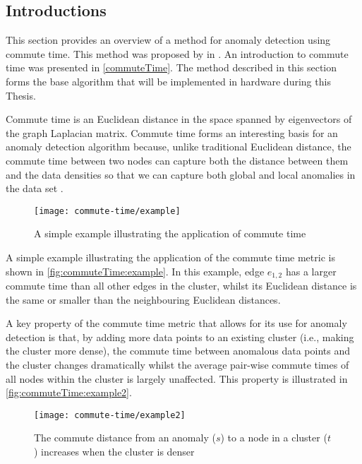 \subsection{Introductions}
\label{anomalyDetection:commuteTime:introduction}
This section provides an overview of a method for anomaly detection using
commute time. This method was proposed by \citeauthor{Khoa:2012} in
 \cite{Khoa:2012}. An introduction to commute time was
presented in \autoref{commuteTime}. The method described in this section forms
the base algorithm that will be implemented in hardware during this Thesis.

Commute time is an Euclidean distance in the space spanned by eigenvectors of
the graph Laplacian matrix. Commute time forms an interesting basis for an
anomaly detection algorithm because, unlike traditional Euclidean distance,
the commute time between two nodes can capture both the distance between them
and the data densities so that we can capture both global and local anomalies in
the data set \cite{Khoa:2012}.

\begin{figure}
    \centering
    \texttt{[image: commute-time/example]}
    \caption{A simple example illustrating the application of commute time
        \cite{Khoa:2012}}
    \label{fig:commuteTime:example}
\end{figure}

A simple example illustrating the application of the commute time metric is
shown in \autoref{fig:commuteTime:example}. In this example, edge $e_{1,2}$ has
a larger commute time than all other edges in the cluster, whilst its Euclidean
distance is the same or smaller than the neighbouring Euclidean distances.

A key property of the commute time metric that allows for its use for anomaly
detection is that, by adding more data points to an existing cluster (i.e.,
making the cluster more dense), the commute time between anomalous data points
and the cluster changes dramatically whilst the average pair-wise commute times
of all nodes within the cluster is largely unaffected. This property is
illustrated in \autoref{fig:commuteTime:example2}.

\begin{figure}
    \centering
    \texttt{[image: commute-time/example2]}
    \caption[The commute distance from an anomaly to a node in a cluster
        increases when the cluster is denser]{The commute distance from an
        anomaly ($s$) to a node in a cluster ($t$) increases when the cluster is
        denser \cite{Khoa:2012}}
\end{figure}

